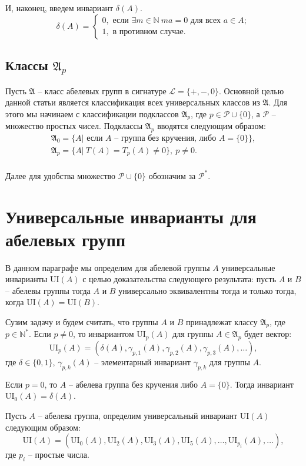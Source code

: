 \documentclass[a4paper,11pt,twoside]{article}
\def\A{{\mathfrak{A}}}
\def\P{{\mathcal{P}}}
\def\L{{\mathcal{L}}}
\def\N{{\mathbb{N}}}
\def\ui{{\mathrm{UI}}}
\begin{document}
И, наконец, введем инвариант $\delta(A)$.
$$\delta(A) = \left\lbrace 
\begin{array}{l}  
0, \text{ если } \exists m \in \N \ ma = 0 \text{ для всех } a \in A; \\ 
1, \text{ в противном случае.}
\end{array} 
\right.$$


\subsection{Классы $\A_p$}

Пусть $\A$ -- класс абелевых групп в сигнатуре $\L = \{+, -, 0\}.$ Основной целью данной статьи является классификация всех универсальных классов из $\A$. Для этого мы начинаем с классификации подклассов $\A_p$, где $p \in \P \cup \{0\}$, а $\P$ -- множество простых чисел. Подклассы $\A_p$ вводятся следующим образом:
$$\begin{array}{c}

\A_0 = \{A |\text{ если } A \text{ -- группа без кручения, либо } A = \{0\} \}, \\
\A_p = \{A | \ T(A) = T_p(A) \neq 0 \}, \ p \neq 0. \\
\end{array}$$ 

Далее для удобства множество $\P \cup \{0\}$ обозначим за $\P^*.$


\section{Универсальные инварианты для абелевых групп}

В данном параграфе мы определим для абелевой группы $A$ универсальные инварианты $\ui(A)$ с целью доказательства следующего результата: пусть $A$ и $B$ -- абелевы группы тогда $A$ и $B$ универсально эквивалентны тогда и только тогда, когда $\ui(A) = \ui(B)$.

Сузим задачу и будем считать, что группы $A$ и $B$ принадлежат классу $\A_p$, где $p \in \N^*$. Если $p \neq 0$, то инвариантом $\ui_p(A)$ для группы $A \in \A_p$ будет вектор:
$$\ui_p(A) = (\delta(A), \gamma_{p,1}(A), \gamma_{p,2}(A), \gamma_{p,3}(A), \ldots),$$
где $\delta \in \{0,1\}$, $\gamma_{p,k}(A)$ -- элементарный инвариант $\gamma_{p,k}$ для группы $A$.

Если $p = 0$, то $A$ -- абелева группа без кручения либо $A = \{0\}$. Тогда инвариант $\ui_0(A) = \delta(A)$.


Пусть $A$ -- абелева группа, определим универсальный инвариант $\ui(A)$ следующим образом:
$$\ui(A) = (\ui_{0}(A), \ui_{2}(A), \ui_{3}(A),\ui_{5}(A),\ldots, \ui_{p_i}(A), \ldots),$$
где $p_i$ -- простые числа.
\end{document}

